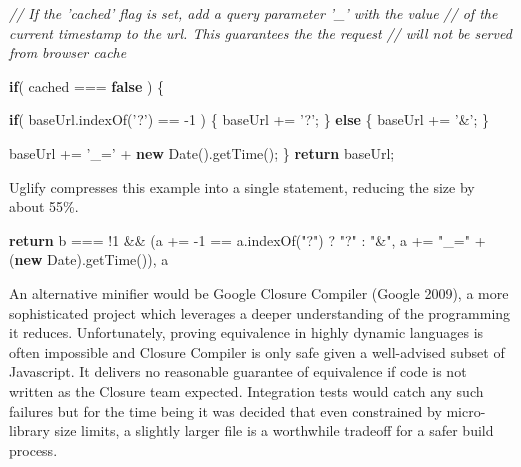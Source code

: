 \documentclass[12pt, ]{article}
\newenvironment{Shaded}{}{}
\newcommand{\KeywordTok}[1]{\textcolor[rgb]{0.00,0.44,0.13}{\textbf{{#1}}}}
\newcommand{\DecValTok}[1]{\textcolor[rgb]{0.25,0.63,0.44}{{#1}}}
\newcommand{\StringTok}[1]{\textcolor[rgb]{0.25,0.44,0.63}{{#1}}}
\newcommand{\CommentTok}[1]{\textcolor[rgb]{0.38,0.63,0.69}{\textit{{#1}}}}
\newcommand{\OtherTok}[1]{\textcolor[rgb]{0.00,0.44,0.13}{{#1}}}
\newcommand{\FunctionTok}[1]{\textcolor[rgb]{0.02,0.16,0.49}{{#1}}}
\newcommand{\NormalTok}[1]{{#1}}
\begin{document}
\begin{Shaded}
\begin{Highlighting}[]
\CommentTok{// If the 'cached' flag is set, add a query parameter '_' with the value }
\CommentTok{// of the current timestamp to the url. This guarantees the the request }
\CommentTok{// will not be served from browser cache}

\KeywordTok{if}\NormalTok{( cached === }\KeywordTok{false} \NormalTok{) \{}
           
   \KeywordTok{if}\NormalTok{( }\OtherTok{baseUrl}\NormalTok{.}\FunctionTok{indexOf}\NormalTok{(}\StringTok{'?'}\NormalTok{) == -}\DecValTok{1} \NormalTok{) \{}
      \NormalTok{baseUrl += }\StringTok{'?'}\NormalTok{;}
   \NormalTok{\} }\KeywordTok{else} \NormalTok{\{}
      \NormalTok{baseUrl += }\StringTok{'&'}\NormalTok{;}
   \NormalTok{\}}
   
   \NormalTok{baseUrl += }\StringTok{'_='} \NormalTok{+ }\KeywordTok{new} \FunctionTok{Date}\NormalTok{().}\FunctionTok{getTime}\NormalTok{();}
\NormalTok{\}}
\KeywordTok{return} \NormalTok{baseUrl;}
\end{Highlighting}
\end{Shaded}

Uglify compresses this example into a single statement, reducing the
size by about 55\%.

\begin{Shaded}
\begin{Highlighting}[]
\KeywordTok{return} \NormalTok{b === !}\DecValTok{1} \NormalTok{&& (a += -}\DecValTok{1} \NormalTok{== }\OtherTok{a}\NormalTok{.}\FunctionTok{indexOf}\NormalTok{(}\StringTok{"?"}\NormalTok{) ? }
\StringTok{"?"} \NormalTok{: }\StringTok{"&"}\NormalTok{, a += }\StringTok{"_="} \NormalTok{+ (}\KeywordTok{new} \NormalTok{Date).}\FunctionTok{getTime}\NormalTok{()), a}
\end{Highlighting}
\end{Shaded}

An alternative minifier would be Google Closure Compiler (Google 2009),
a more sophisticated project which leverages a deeper understanding of
the programming it reduces. Unfortunately, proving equivalence in highly
dynamic languages is often impossible and Closure Compiler is only safe
given a well-advised subset of Javascript. It delivers no reasonable
guarantee of equivalence if code is not written as the Closure team
expected. Integration tests would catch any such failures but for the
time being it was decided that even constrained by micro-library size
limits, a slightly larger file is a worthwhile tradeoff for a safer
build process.
\end{document}
